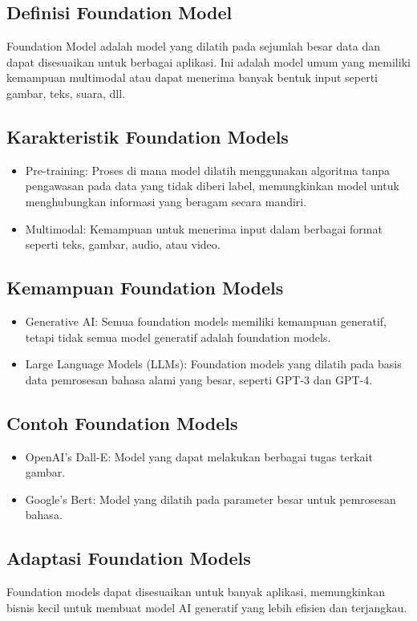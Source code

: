 \documentclass{article}
\begin{document}
\subsection{Definisi Foundation Model}
Foundation Model adalah model yang dilatih pada sejumlah besar data dan dapat disesuaikan untuk berbagai aplikasi. Ini adalah model umum yang memiliki kemampuan multimodal atau dapat menerima banyak bentuk input seperti gambar, teks, suara, dll.

\subsection{Karakteristik Foundation Models}
\begin{itemize}
    \item Pre-training: Proses di mana model dilatih menggunakan algoritma tanpa pengawasan pada data yang tidak diberi label, memungkinkan model untuk menghubungkan informasi yang beragam secara mandiri.
    \item Multimodal: Kemampuan untuk menerima input dalam berbagai format seperti teks, gambar, audio, atau video.
\end{itemize}

\subsection{Kemampuan Foundation Models}
\begin{itemize}
    \item Generative AI: Semua foundation models memiliki kemampuan generatif, tetapi tidak semua model generatif adalah foundation models.
    \item Large Language Models (LLMs): Foundation models yang dilatih pada basis data pemrosesan bahasa alami yang besar, seperti GPT-3 dan GPT-4.
\end{itemize}

\subsection{Contoh Foundation Models}
\begin{itemize}
    \item OpenAI's Dall-E: Model yang dapat melakukan berbagai tugas terkait gambar.
    \item Google's Bert: Model yang dilatih pada parameter besar untuk pemrosesan bahasa.
\end{itemize}

\subsection{Adaptasi Foundation Models}
Foundation models dapat disesuaikan untuk banyak aplikasi, memungkinkan bisnis kecil untuk membuat model AI generatif yang lebih efisien dan terjangkau.
\end{document}
